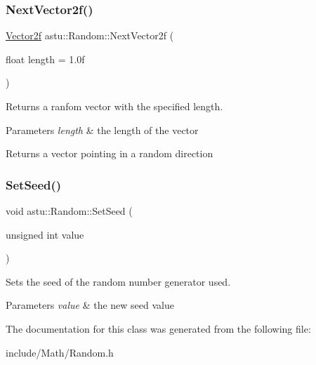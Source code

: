 \subsubsection{\texorpdfstring{Next\+Vector2f()}{NextVector2f()}}
{\footnotesize\ttfamily \hyperlink{classastu_1_1Vector2}{Vector2f} astu\+::\+Random\+::\+Next\+Vector2f (\begin{DoxyParamCaption}\item[{float}]{length = {\ttfamily 1.0f} }\end{DoxyParamCaption})}

Returns a ranfom vector with the specified length.


\begin{DoxyParams}{Parameters}
{\em length} & the length of the vector \\
\hline
\end{DoxyParams}
\begin{DoxyReturn}{Returns}
a vector pointing in a random direction 
\end{DoxyReturn}
\mbox{\label{classastu_1_1Random_a2bbce78e953c8c272d947cda155302c2}} 
\subsubsection{\texorpdfstring{Set\+Seed()}{SetSeed()}}
{\footnotesize\ttfamily void astu\+::\+Random\+::\+Set\+Seed (\begin{DoxyParamCaption}\item[{unsigned int}]{value }\end{DoxyParamCaption})}

Sets the seed of the random number generator used.


\begin{DoxyParams}{Parameters}
{\em value} & the new seed value \\
\hline
\end{DoxyParams}


The documentation for this class was generated from the following file\+:\begin{DoxyCompactItemize}
\item 
include/\+Math/Random.\+h\end{DoxyCompactItemize}

